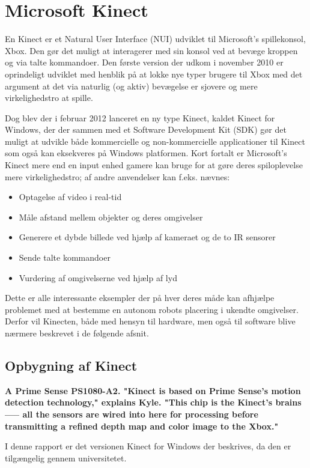 \section{Microsoft Kinect}
En Kinect er et Natural User Interface (NUI) udviklet til Microsoft's spillekonsol, Xbox.
Den gør det muligt at interagerer med sin konsol ved at bevæge kroppen og via talte kommandoer.
Den første version der udkom i november 2010\cite{kinectWiki} er oprindeligt udviklet med henblik på at lokke nye typer brugere til Xbox med det argument at det via naturlig (og aktiv) bevægelse er sjovere og mere virkelighedstro at spille.

Dog blev der i februar 2012 lanceret en ny type Kinect, kaldet Kinect for Windows, der der sammen med et Software Development Kit (SDK) gør det muligt at udvikle både kommercielle og non-kommercielle applicationer til Kinect som også kan eksekveres på Windows platformen.
Kort fortalt er Microsoft's Kinect mere end en input enhed gamere kan bruge for at gøre deres spiloplevelse mere virkelighedstro; af andre anvendelser kan f.eks. nævnes\cite[s.~17]{kinectProgrammingGuide}:

\begin{itemize}
\item Optagelse af video i real-tid
\item Måle afstand mellem objekter og deres omgivelser
\item Generere et dybde billede ved hjælp af kameraet og de to IR sensorer
\item Sende talte kommandoer
\item Vurdering af omgivelserne ved hjælp af lyd
\end{itemize}

Dette er alle interessante eksempler der på hver deres måde kan afhjælpe problemet med at bestemme en autonom robots placering i ukendte omgivelser.
Derfor vil Kinecten, både med hensyn til hardware, men også til software blive nærmere beskrevet i de følgende afsnit.


\subsection{Opbygning af Kinect}
\textbf{A Prime Sense PS1080-A2.
"Kinect is based on Prime Sense's motion detection technology," explains Kyle.
"This chip is the Kinect's brains —– all the sensors are wired into here for processing before transmitting a refined depth map and color image to the Xbox."}

I denne rapport er det versionen Kinect for Windows der beskrives, da den er tilgængelig gennem universitetet.

